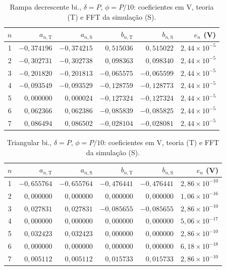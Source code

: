 \begin{table}[H]
\centering
\footnotesize\setlength{\tabcolsep}{2pt}
\caption{Rampa decrescente bi., $\delta=P$, $\phi=P/10$: coeficientes em V, teoria (T) e FFT da simulação (S).}\label{tab:coef_comp11}
\begin{tabular}{crrrrr}\hline
$n$ & $a_{n,\mathrm T}$ & $a_{n,\mathrm S}$ & $b_{n,\mathrm T}$ & $b_{n,\mathrm S}$ & $e_n$ (V) \\ \hline
1 & $-0{,}374196$ & $-0{,}374215$ & $0{,}515036$ & $0{,}515022$ & $2{,}44\!\times\!10^{-5}$ \\
2 & $-0{,}302731$ & $-0{,}302738$ & $0{,}098363$ & $0{,}098340$ & $2{,}44\!\times\!10^{-5}$ \\
3 & $-0{,}201820$ & $-0{,}201813$ & $-0{,}065575$ & $-0{,}065599$ & $2{,}44\!\times\!10^{-5}$ \\
4 & $-0{,}093549$ & $-0{,}093529$ & $-0{,}128759$ & $-0{,}128773$ & $2{,}44\!\times\!10^{-5}$ \\
5 & $0{,}000000$ & $0{,}000024$ & $-0{,}127324$ & $-0{,}127324$ & $2{,}44\!\times\!10^{-5}$ \\
6 & $0{,}062366$ & $0{,}062386$ & $-0{,}085839$ & $-0{,}085825$ & $2{,}44\!\times\!10^{-5}$ \\
7 & $0{,}086494$ & $0{,}086502$ & $-0{,}028104$ & $-0{,}028081$ & $2{,}44\!\times\!10^{-5}$ \\
\hline\end{tabular}
\end{table}
\begin{table}[H]
\centering
\footnotesize\setlength{\tabcolsep}{2pt}
\caption{Triangular bi., $\delta=P$, $\phi=P/10$: coeficientes em V, teoria (T) e FFT da simulação (S).}\label{tab:coef_comp12}
\begin{tabular}{crrrrr}\hline
$n$ & $a_{n,\mathrm T}$ & $a_{n,\mathrm S}$ & $b_{n,\mathrm T}$ & $b_{n,\mathrm S}$ & $e_n$ (V) \\ \hline
1 & $-0{,}655764$ & $-0{,}655764$ & $-0{,}476441$ & $-0{,}476441$ & $2{,}86\!\times\!10^{-10}$ \\
2 & $0{,}000000$ & $0{,}000000$ & $0{,}000000$ & $0{,}000000$ & $1{,}06\!\times\!10^{-16}$ \\
3 & $0{,}027831$ & $0{,}027831$ & $-0{,}085655$ & $-0{,}085655$ & $2{,}86\!\times\!10^{-10}$ \\
4 & $0{,}000000$ & $0{,}000000$ & $0{,}000000$ & $0{,}000000$ & $5{,}06\!\times\!10^{-17}$ \\
5 & $0{,}032423$ & $0{,}032423$ & $0{,}000000$ & $0{,}000000$ & $2{,}86\!\times\!10^{-10}$ \\
6 & $0{,}000000$ & $0{,}000000$ & $0{,}000000$ & $0{,}000000$ & $6{,}18\!\times\!10^{-18}$ \\
7 & $0{,}005112$ & $0{,}005112$ & $0{,}015733$ & $0{,}015733$ & $2{,}86\!\times\!10^{-10}$ \\
\hline\end{tabular}
\end{table}
